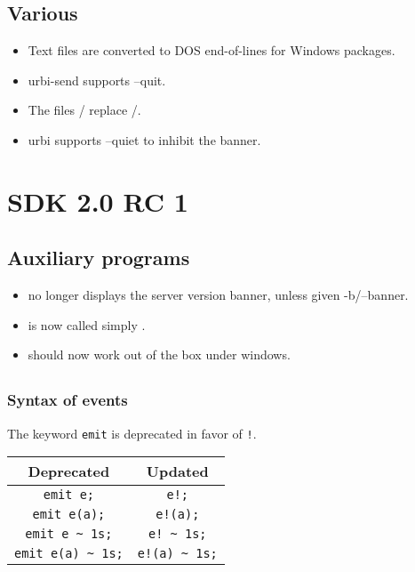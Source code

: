 \subsection{Various}

\begin{itemize}
\item Text files are converted to DOS end-of-lines for Windows packages.

\item urbi-send supports --quit.

\item The files / replace
  /.

\item urbi supports --quiet to inhibit the banner.
\end{itemize}

\section{\urbi SDK 2.0 RC 1}

\subsection{Auxiliary programs}

\begin{itemize}
\item {} no longer displays the server version
  banner, unless given -b/--banner.
\item {} is now called simply .
\item {} should now work out of the box under windows.
\end{itemize}


\subsection{\us}

\subsubsection{Syntax of events}

The keyword \lstinline|emit| is deprecated in favor of \lstinline|!|.

\begin{center}
  \begin{tabular}{|c|c|}
    \hline
    Deprecated & Updated \\
    \hline
    \lstinline|emit e;| &              \lstinline|e!;| \\
    \lstinline|emit e(a);| &           \lstinline|e!(a);| \\
    \lstinline|emit e ~ 1s;| &         \lstinline|e! ~ 1s;| \\
    \lstinline|emit e(a) ~ 1s;| &      \lstinline|e!(a) ~ 1s;| \\
    \hline
  \end{tabular}
\end{center}

